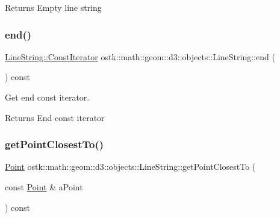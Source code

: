 \begin{DoxyReturn}{Returns}
Empty line string 
\end{DoxyReturn}
\mbox{\label{classostk_1_1math_1_1geom_1_1d3_1_1objects_1_1_line_string_ae83df237122f545486113c146d483e52}} 
\subsubsection{\texorpdfstring{end()}{end()}}
{\footnotesize\ttfamily \hyperlink{classostk_1_1math_1_1geom_1_1d3_1_1objects_1_1_line_string_a5d184ce7a4ef5613a621f9b628e56de8}{Line\+String\+::\+Const\+Iterator} ostk\+::math\+::geom\+::d3\+::objects\+::\+Line\+String\+::end (\begin{DoxyParamCaption}{ }\end{DoxyParamCaption}) const}



Get end const iterator. 

\begin{DoxyReturn}{Returns}
End const iterator 
\end{DoxyReturn}
\mbox{\label{classostk_1_1math_1_1geom_1_1d3_1_1objects_1_1_line_string_ac68fc844aa3b7a55673377b0b68571ae}} 
\subsubsection{\texorpdfstring{get\+Point\+Closest\+To()}{getPointClosestTo()}}
{\footnotesize\ttfamily \hyperlink{classostk_1_1math_1_1geom_1_1d3_1_1objects_1_1_point}{Point} ostk\+::math\+::geom\+::d3\+::objects\+::\+Line\+String\+::get\+Point\+Closest\+To (\begin{DoxyParamCaption}\item[{const \hyperlink{classostk_1_1math_1_1geom_1_1d3_1_1objects_1_1_point}{Point} \&}]{a\+Point }\end{DoxyParamCaption}) const}



